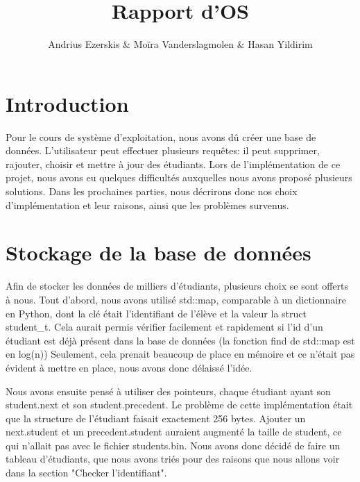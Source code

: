 \documentclass[utf8]{article}
\begin{document}
\begin{titlepage}
    

\author{Andrius Ezerskis \& Moïra Vanderslagmolen \& Hasan Yildirim}
\title{Rapport d'OS}

\maketitle
\end{titlepage}

\section{Introduction}
\par
Pour le cours de système d'exploitation, nous avons dû créer une base de données. 
L'utilisateur peut effectuer plusieurs requêtes: il peut supprimer, rajouter, choisir
et mettre à jour des étudiants. Lors de l'implémentation de ce projet, nous avons eu quelques difficultés
auxquelles nous avons proposé plusieurs solutions. Dans les prochaines parties, nous décrirons donc
nos choix d'implémentation et leur raisons, ainsi que les problèmes survenus.
\par


\section{Stockage de la base de données}
\indent{}
\par
Afin de stocker les données de milliers d'étudiants, plusieurs choix se sont offerts à nous. 
Tout d'abord, nous avons utilisé std::map, comparable à un dictionnaire en Python, dont la clé était l'identifiant de l'élève et la valeur la struct student\_t. 
Cela aurait permis vérifier facilement et rapidement si l'id d'un étudiant est déjà présent dans la base de données (la fonction find de std::map est en log(n))
Seulement, cela prenait beaucoup de place en mémoire et ce n'était pas évident à mettre en place, nous avons donc délaissé l'idée. 
\par
\indent{}
\par
Nous avons ensuite pensé à utiliser des pointeurs, chaque étudiant
ayant son student.next et son student.precedent. Le problème de cette implémentation était que la structure de l'étudiant faisait exactement 256 bytes.
Ajouter un next.student et un precedent.student auraient augmenté la taille de student, ce qui n'allait pas avec le fichier students.bin.
Nous avons donc décidé de faire un tableau d'étudiants, que nous avons triés pour des raisons que nous allons voir dans la section "Checker l'identifiant".
\par
\end{document}
